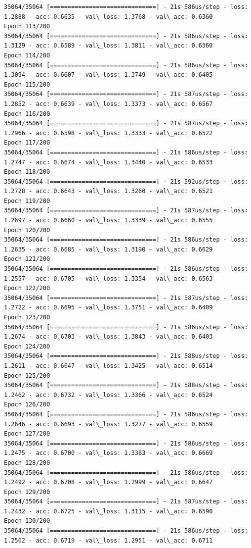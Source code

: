\documentclass[11pt]{article}
\begin{document}
\begin{Verbatim}[commandchars=\\\{\}]
35064/35064 [==============================] - 21s 586us/step - loss: 1.2888 - acc: 0.6635 - val\_loss: 1.3768 - val\_acc: 0.6360
Epoch 113/200
35064/35064 [==============================] - 21s 586us/step - loss: 1.3129 - acc: 0.6589 - val\_loss: 1.3811 - val\_acc: 0.6360
Epoch 114/200
35064/35064 [==============================] - 21s 586us/step - loss: 1.3094 - acc: 0.6607 - val\_loss: 1.3749 - val\_acc: 0.6405
Epoch 115/200
35064/35064 [==============================] - 21s 587us/step - loss: 1.2852 - acc: 0.6639 - val\_loss: 1.3373 - val\_acc: 0.6567
Epoch 116/200
35064/35064 [==============================] - 21s 587us/step - loss: 1.2966 - acc: 0.6598 - val\_loss: 1.3333 - val\_acc: 0.6522
Epoch 117/200
35064/35064 [==============================] - 21s 586us/step - loss: 1.2747 - acc: 0.6674 - val\_loss: 1.3440 - val\_acc: 0.6533
Epoch 118/200
35064/35064 [==============================] - 21s 592us/step - loss: 1.2728 - acc: 0.6643 - val\_loss: 1.3260 - val\_acc: 0.6521
Epoch 119/200
35064/35064 [==============================] - 21s 587us/step - loss: 1.2697 - acc: 0.6660 - val\_loss: 1.3339 - val\_acc: 0.6555
Epoch 120/200
35064/35064 [==============================] - 21s 586us/step - loss: 1.2635 - acc: 0.6685 - val\_loss: 1.3190 - val\_acc: 0.6629
Epoch 121/200
35064/35064 [==============================] - 21s 586us/step - loss: 1.2557 - acc: 0.6705 - val\_loss: 1.3354 - val\_acc: 0.6563
Epoch 122/200
35064/35064 [==============================] - 21s 587us/step - loss: 1.2722 - acc: 0.6695 - val\_loss: 1.3751 - val\_acc: 0.6409
Epoch 123/200
35064/35064 [==============================] - 21s 586us/step - loss: 1.2674 - acc: 0.6703 - val\_loss: 1.3843 - val\_acc: 0.6403
Epoch 124/200
35064/35064 [==============================] - 21s 588us/step - loss: 1.2611 - acc: 0.6647 - val\_loss: 1.3425 - val\_acc: 0.6514
Epoch 125/200
35064/35064 [==============================] - 21s 588us/step - loss: 1.2462 - acc: 0.6732 - val\_loss: 1.3366 - val\_acc: 0.6524
Epoch 126/200
35064/35064 [==============================] - 21s 586us/step - loss: 1.2646 - acc: 0.6693 - val\_loss: 1.3277 - val\_acc: 0.6559
Epoch 127/200
35064/35064 [==============================] - 21s 586us/step - loss: 1.2475 - acc: 0.6700 - val\_loss: 1.3383 - val\_acc: 0.6669
Epoch 128/200
35064/35064 [==============================] - 21s 586us/step - loss: 1.2492 - acc: 0.6708 - val\_loss: 1.2999 - val\_acc: 0.6647
Epoch 129/200
35064/35064 [==============================] - 21s 587us/step - loss: 1.2432 - acc: 0.6725 - val\_loss: 1.3115 - val\_acc: 0.6590
Epoch 130/200
35064/35064 [==============================] - 21s 586us/step - loss: 1.2502 - acc: 0.6719 - val\_loss: 1.2951 - val\_acc: 0.6711

\end{Verbatim}
\end{document}
